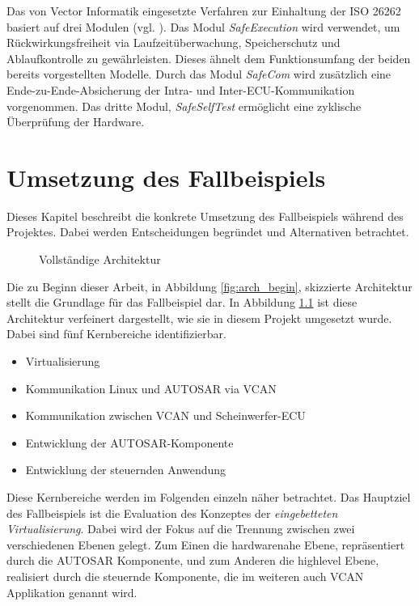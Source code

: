 \documentclass[
  a4paper,					    %
  twoside,
  DIV=calc,     				%
  bibliography=totoc,
  cleardoublepage=empty,
  ngerman,     					%
  final       					%
]{scrbook}
\begin{document}
Das von Vector Informatik eingesetzte Verfahren zur Einhaltung der ISO 26262 basiert auf drei Modulen (vgl. \cite{microsar}). Das Modul \emph{SafeExecution} wird verwendet, um Rückwirkungsfreiheit via Laufzeitüberwachung, Speicherschutz und Ablaufkontrolle zu gewährleisten. Dieses ähnelt dem Funktionsumfang der beiden bereits vorgestellten Modelle. Durch das Modul \emph{SafeCom} wird zusätzlich eine Ende-zu-Ende-Absicherung der Intra- und Inter-ECU-Kommunikation vorgenommen. Das dritte Modul, \emph{SafeSelfTest} ermöglicht eine zyklische Überprüfung der Hardware.









\chapter{Umsetzung des Fallbeispiels}
\label{sec:Umsetzung_Fallbeispiel}
Dieses Kapitel beschreibt die konkrete Umsetzung des Fallbeispiels während des Projektes. Dabei werden Entscheidungen begründet und Alternativen betrachtet.

\begin{figure}[ht]
    \centering
    
    \caption{Vollständige Architektur}
    \label{fig:arch_finished}
\end{figure}

Die zu Beginn dieser Arbeit, in Abbildung \ref{fig:arch_begin}, skizzierte Architektur stellt die Grundlage für das Fallbeispiel dar. In Abbildung \ref{fig:arch_finished} ist diese Architektur verfeinert dargestellt, wie sie in diesem Projekt umgesetzt wurde. Dabei sind fünf Kernbereiche identifizierbar.

\begin{itemize}
    \item Virtualisierung
    \item Kommunikation Linux und AUTOSAR via VCAN
    \item Kommunikation zwischen VCAN und Scheinwerfer-ECU
    \item Entwicklung der AUTOSAR-Komponente
    \item Entwicklung der steuernden Anwendung
\end{itemize}

Diese Kernbereiche werden im Folgenden einzeln näher betrachtet. Das Hauptziel des Fallbeispiels ist die Evaluation des Konzeptes der \emph{eingebetteten Virtualisierung}. Dabei wird der Fokus auf die Trennung zwischen zwei verschiedenen Ebenen gelegt. Zum Einen die hardwarenahe Ebene, repräsentiert durch die AUTOSAR Komponente, und zum Anderen die highlevel Ebene, realisiert durch die steuernde Komponente, die im weiteren auch VCAN Applikation genannt wird.
\end{document}
